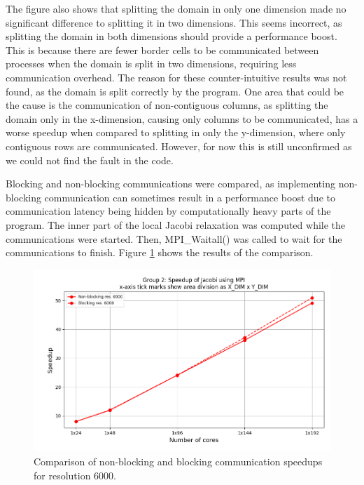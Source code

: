 The figure also shows that splitting the domain in only one dimension made no significant difference to splitting it in two dimensions. This seems incorrect, as splitting the domain in both dimensions should provide a performance boost. This is because there are fewer border cells to be communicated between processes when the domain is split in two dimensions, requiring less communication overhead. The reason for these counter-intuitive results was not found, as the domain is split correctly by the program. One area that could be the cause is the communication of non-contiguous columns, as splitting the domain only in the x-dimension, causing only columns to be communicated, has a worse speedup when compared to splitting in only the y-dimension, where only contiguous rows are communicated. However, for now this is still unconfirmed as we could not find the fault in the code.

Blocking and non-blocking communications were compared, as implementing non-blocking communication can sometimes result in a performance boost due to communication latency being hidden by computationally heavy parts of the program. The inner part of the local Jacobi relaxation was computed while the communications were started. Then, MPI\_Waitall() was called to wait for the communications to finish. Figure \ref{fig:mpi-block_vs_nonblock} shows the results of the comparison. 

\begin{figure}[h]
    \centering
    \includegraphics[scale=0.6]{figures/group2_jacobiMPI_blocking_nonblocking_6000.png}
    \caption{Comparison of non-blocking and blocking communication speedups for resolution 6000.}
    \label{fig:mpi-block_vs_nonblock}
\end{figure}

